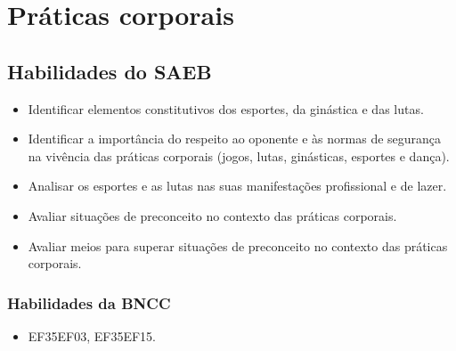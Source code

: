 \chapter{Práticas corporais}

\section*{Habilidades do SAEB}


\begin{itemize}
\item
  Identificar elementos constitutivos dos esportes, da ginástica e das
  lutas.
\item
  Identificar a importância do respeito ao oponente e às normas de
  segurança na vivência das práticas corporais (jogos, lutas,
  ginásticas, esportes e dança).
\item
  Analisar os esportes e as lutas nas suas manifestações profissional e
  de lazer.
\item
  Avaliar situações de preconceito no contexto das práticas corporais.
\item
  Avaliar meios para superar situações de preconceito no contexto das
  práticas corporais.
\end{itemize}

\subsection{Habilidades da BNCC}

\begin{itemize}
\item EF35EF03, EF35EF15.
\end{itemize}


